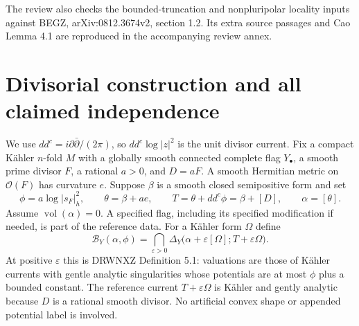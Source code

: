 \documentclass[11pt]{article}
\newcommand{\ddc}{dd^c}
\newcommand{\vol}{\operatorname{vol}}
\newcommand{\B}{\mathcal B}
\begin{document}
The review also checks the bounded-truncation and nonpluripolar locality inputs against BEGZ, arXiv:0812.3674v2, section 1.2. Its extra source passages and Cao Lemma 4.1 are reproduced in the accompanying review annex.

\section{Divisorial construction and all claimed independence}
We use $\ddc=i\partial\bar\partial/(2\pi)$, so $\ddc\log|z|^2$ is the unit divisor current. Fix a compact K\"ahler $n$-fold $M$ with a globally smooth connected complete flag $Y_\bullet$, a smooth prime divisor $F$, a rational $a>0$, and $D=aF$. A smooth Hermitian metric on $\mathcal O(F)$ has curvature $e$. Suppose $\beta$ is a smooth closed semipositive form and set
\[
 \phi=a\log|s_F|_h^2,\qquad \theta=\beta+ae,\qquad
 T=\theta+\ddc\phi=\beta+[D],\qquad \alpha=[\theta].
\]
Assume $\vol(\alpha)=0$. A specified flag, including its specified modification if needed, is part of the reference data. For a K\"ahler form $\Omega$ define
\[
 \B_Y(\alpha,\phi)=\bigcap_{\varepsilon>0}
 \Delta_Y\bigl(\alpha+\varepsilon[\Omega];T+\varepsilon\Omega\bigr).
 \tag{2.1}
\]
At positive $\varepsilon$ this is DRWNXZ Definition 5.1: valuations are those of K\"ahler currents with gentle analytic singularities whose potentials are at most $\phi$ plus a bounded constant. The reference current $T+\varepsilon\Omega$ is K\"ahler and gently analytic because $D$ is a rational smooth divisor. No artificial convex shape or appended potential label is involved.
\end{document}

